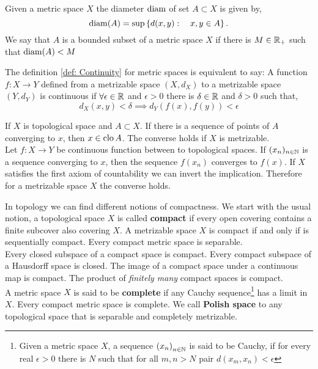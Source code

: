 Given a metric space $X$ the diameter $\mathrm{diam}$ of set $A\subset X$ is given by,
\begin{equation*}
	\mathrm{diam}(A)=\sup\left\lbrace d(x,y): \quad x, y \in A \right\rbrace.
\end{equation*} 
We say that $A$ is a bounded subset of a metric space $X$ if there is $M\in \mathbb{R}_+$ such that $\mathrm{diam}(A)<M$
\begin{definition}
	The definition \ref{def: Continuity} for metric spaces is equivalent to say: A function $f:X\rightarrow Y$ defined from a metrizable space $(X, d_X)$ to a metrizable space $(Y, d_Y)$ is continuous if $\forall \epsilon\in\mathbb{R}$ and $\epsilon>0$ there is $\delta \in \mathbb{R}$ and $\delta>0$ such that,
	\begin{equation*}
		d_X(x, y)<\delta \implies d_Y(f(x),f(y))<\epsilon
	\end{equation*}
\end{definition}
If $X$ is topological space and $A\subset X$. If there is a sequence of points of $A$ converging to $x$, then $x\in\mathrm{clo}\, A$. The converse holds if $X$ is metrizable. \\

Let $f: X\rightarrow Y$ be continuous function between to topological spaces. If $(x_n)_{n\in \mathbb{N}}$ is a sequence converging to $x$, then the sequence $f(x_n)$ converges to $f(x)$. If $X$ satisfies the first axiom of countability we can invert the implication. Therefore for a metrizable space $X$ the converse holds. 


In topology we can find different notions of compactness. We start with the usual notion, a topological space $X$ is called \textbf{compact} if every open covering contains a finite subcover also covering $X$. A metrizable space $X$ is compact if and only if is sequentially compact. Every compact metric space is separable. \\


Every closed subspace of a compact space is compact. Every compact subspace of a Hausdorff space is closed. The image of a compact space under a continuous map is compact. The product of \emph{finitely many} compact spaces is compact. \\

A metric space $X$ is said to be \textbf{complete} if any Cauchy sequence\footnote{Given a metric space $X$, a sequence $\left( x_n \right)_{n\in\mathbb{N}}$ is said to be Cauchy, if for every real $\epsilon>0$ there is $N$ such that for all $m,n>N$ pair $d(x_m, x_n)<\epsilon$} has a limit in $X$. Every compact metric space is complete. We call \textbf{Polish space} to any topological space that is separable and completely metrizable. 


